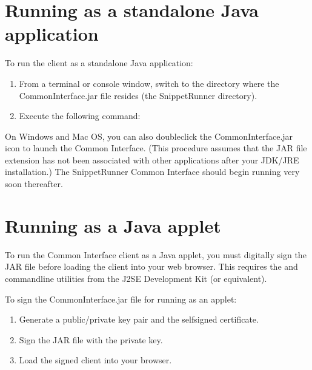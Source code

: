 \documentclass[letterpaper,12pt,english,openany,oneside]{sphinxmanual}
\begin{document}
\section{Running as a standalone Java application}
\label{\detokenize{Snippet_SnippetRunnerCookbook:running-as-a-standalone-java-application}}
To run the client as a standalone Java application:
\begin{enumerate}
%
\item {} 
From a terminal or console window, switch to the directory where the CommonInterface.jar file resides (the SnippetRunner directory).

\item {} 
Execute the following command: 

\end{enumerate}

On Windows and Mac OS, you can also double\sphinxhyphen{}click the CommonInterface.jar icon to launch the Common Interface. (This procedure assumes that the JAR file extension has not been associated with other applications after your JDK/JRE installation.) The SnippetRunner Common Interface should begin running very soon thereafter.


\section{Running as a Java applet}
\label{\detokenize{Snippet_SnippetRunnerCookbook:running-as-a-java-applet}}
To run the Common Interface client as a Java applet, you must digitally sign the JAR file before loading the client into your web browser. This requires the  and  command\sphinxhyphen{}line utilities from the J2SE Development Kit (or equivalent).

To sign the CommonInterface.jar file for running as an applet:
\begin{enumerate}
%
\item {} 
Generate a public/private key pair and the self\sphinxhyphen{}signed certificate.

\item {} 
Sign the JAR file with the private key.

\item {} 
Load the signed client into your browser.

\end{enumerate}
\end{document}
